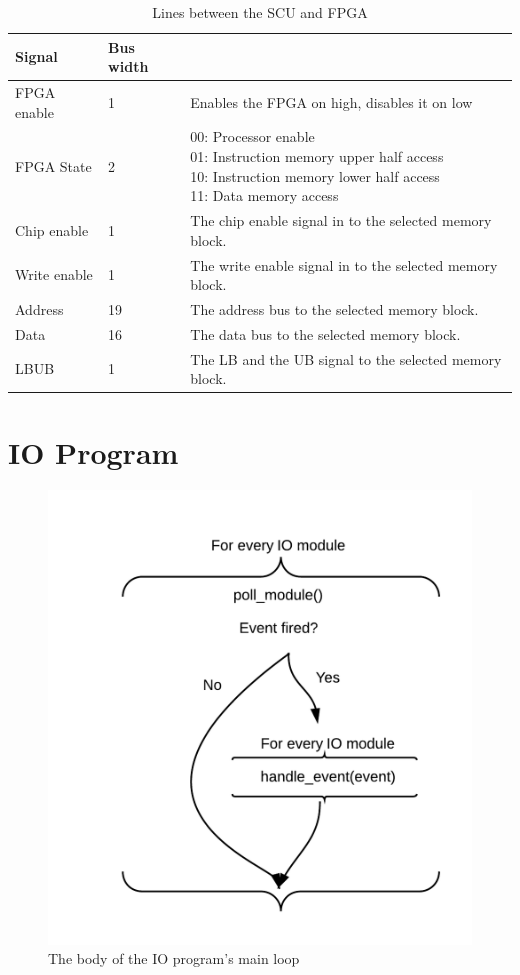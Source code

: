 \begin{table}[H]
    \begin{tabular}{| l | l | l |}
        \hline
        Signal & Bus width & \\
        \hline
        FPGA enable & 1 & Enables the FPGA on high, disables it on low\\
        \hline
        FPGA State & 2 & \pbox{20cm}{00: Processor enable\\01: Instruction memory upper half access\\10: Instruction memory lower half access\\11: Data memory access}\\
        \hline
        Chip enable & 1 & The chip enable signal in to the selected memory block.\\
        \hline
        Write enable & 1 & The write enable signal in to the selected memory block.\\
        \hline
        Address & 19 & The address bus to the selected memory block.\\
        \hline
        Data & 16 & The data bus to the selected memory block.\\
        \hline
        LBUB & 1 & The LB and the UB signal to the selected memory block.\\
        \hline
    \end{tabular}
    \label{tab:scu-fpga-link}
    \caption{Lines between the SCU and FPGA}
\end{table}

\section{IO Program}
\begin{figure}[H]
    \includegraphics[width=\textwidth]{io/fig/program.png}
    \caption{The body of the IO program's main loop}
\end{figure}

